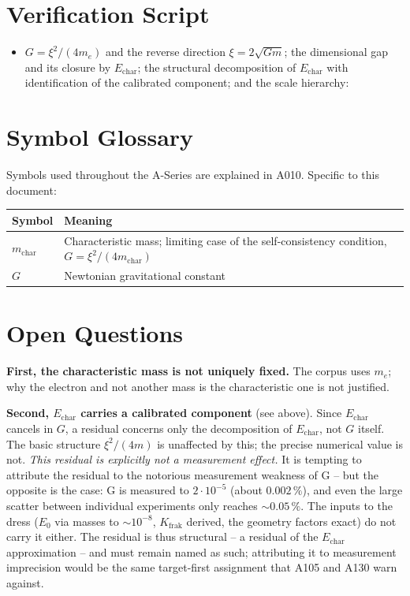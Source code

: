 \section{Verification Script}

\begin{itemize}
  \item $G=\xi^2/(4m_e)$ and the reverse direction $\xi=2\sqrt{Gm}$; the
    dimensional gap and its closure by $E_\text{char}$; the structural
    decomposition of $E_\text{char}$ with identification of the calibrated
    component; and the scale hierarchy:
\end{itemize}

\section{Symbol Glossary}

Symbols used throughout the A-Series are explained in A010.
Specific to this document:

\begin{center}
\renewcommand{\arraystretch}{1.3}
{\small\begin{tabular}{lp{9cm}}
\toprule
Symbol & Meaning \\
\midrule
$m_\text{char}$ & Characteristic mass; limiting case of the self-consistency
  condition, $G = \xi^2/(4m_\text{char})$ \\
$G$ & Newtonian gravitational constant \\
\bottomrule
\end{tabular}}
\renewcommand{\arraystretch}{1.0}
\end{center}

\section{Open Questions}

\textbf{First, the characteristic mass is not uniquely fixed.} The corpus uses
$m_e$; why the electron and not another mass is the characteristic one is not
justified.

\textbf{Second, $E_\text{char}$ carries a calibrated component} (see above).
Since $E_\text{char}$ cancels in $G$, a residual concerns only the decomposition of $E_\text{char}$, not $G$ itself.
The basic structure $\xi^2/(4m)$ is unaffected by this; the precise numerical
value is not. \emph{This residual is explicitly not a measurement effect.} It is
tempting to attribute the residual to the notorious measurement weakness
of G -- but the opposite is the case: G is measured to $2\cdot10^{-5}$ (about
$0{.}002\,\%$), and even the large scatter between individual experiments only
reaches $\sim0{.}05\,\%$. The inputs to the dress ($E_0$ via masses to $\sim10^{-8}$, $K_\text{frak}$
derived, the geometry factors exact) do not carry it either. The residual is thus
structural -- a residual of the $E_\text{char}$ approximation -- and must remain
named as such; attributing it to measurement imprecision would be the same
target-first assignment that A105 and A130 warn against.

